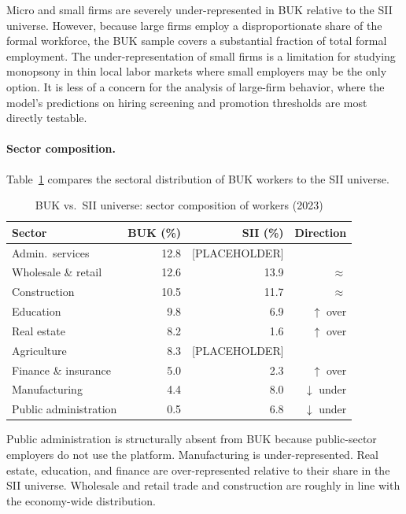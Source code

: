 \documentclass[11pt]{article}
\begin{document}
Micro and small firms are severely under-represented in BUK relative to the SII universe. However, because large firms employ a disproportionate share of the formal workforce, the BUK sample covers a substantial fraction of total formal employment. The under-representation of small firms is a limitation for studying monopsony in thin local labor markets where small employers may be the only option. It is less of a concern for the analysis of large-firm behavior, where the model's predictions on hiring screening and promotion thresholds are most directly testable.

\paragraph{Sector composition.} Table~\ref{tab:selection_sector} compares the sectoral distribution of BUK workers to the SII universe.

\begin{table}[h]
\centering
\caption{BUK vs.\ SII universe: sector composition of workers (2023)}
\label{tab:selection_sector}
\begin{tabular}{lrrr}
\hline
Sector & BUK (\%) & SII (\%) & Direction \\
\hline
Admin.\ services       & 12.8 & [PLACEHOLDER]  & \\
Wholesale \& retail    & 12.6 & 13.9 & $\approx$ \\
Construction           & 10.5 & 11.7 & $\approx$ \\
Education              &  9.8 &  6.9 & $\uparrow$ over \\
Real estate            &  8.2 &  1.6 & $\uparrow$ over \\
Agriculture            &  8.3 & [PLACEHOLDER]  & \\
Finance \& insurance   &  5.0 &  2.3 & $\uparrow$ over \\
Manufacturing          &  4.4 &  8.0 & $\downarrow$ under \\
Public administration  &  0.5 &  6.8 & $\downarrow$ under \\
\hline
\end{tabular}
\end{table}

Public administration is structurally absent from BUK because public-sector employers do not use the platform. Manufacturing is under-represented. Real estate, education, and finance are over-represented relative to their share in the SII universe. Wholesale and retail trade and construction are roughly in line with the economy-wide distribution.
\end{document}
